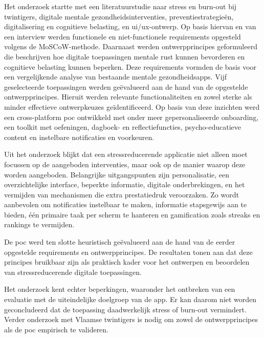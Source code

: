 \vspace{1em}

Het onderzoek startte met een literatuurstudie naar stress en burn-out bij twintigers, digitale mentale gezondheidsinterventies, preventiestrategieën, digitalisering en cognitieve belasting, en \acrshort{ui}/\acrshort{ux}-ontwerp. Op basis hiervan en van een interview werden functionele en niet-functionele requirements opgesteld volgens de MoSCoW-methode. Daarnaast werden ontwerpprincipes geformuleerd die beschrijven hoe digitale toepassingen mentale rust kunnen bevorderen en cognitieve belasting kunnen beperken. Deze requirements vormden de basis voor een vergelijkende analyse van bestaande mentale gezondheidsapps. Vijf geselecteerde toepassingen werden geëvalueerd aan de hand van de opgestelde ontwerpprincipes. Hieruit werden relevante functionaliteiten en zowel sterke als minder effectieve ontwerpkeuzes geïdentificeerd. Op basis van deze inzichten werd een cross-platform \acrshort{poc} ontwikkeld met onder meer gepersonaliseerde onboarding, een toolkit met oefeningen, dagboek- en reflectiefuncties, psycho-educatieve content en instelbare notificaties en voorkeuren.

\vspace{1em}

Uit het onderzoek blijkt dat een stressreducerende applicatie niet alleen moet focussen op de aangeboden interventies, maar ook op de manier waarop deze worden aangeboden. Belangrijke uitgangspunten zijn personalisatie, een overzichtelijke interface, beperkte informatie, digitale onderbrekingen, en het vermijden van mechanismen die extra prestatiedruk veroorzaken. Zo wordt aanbevolen om notificaties instelbaar te maken, informatie stapsgewijs aan te bieden, één primaire taak per scherm te hanteren en gamification zoals streaks en rankings te vermijden.

\vspace{1em}

De \acrshort{poc} werd ten slotte heuristisch geëvalueerd aan de hand van de eerder opgestelde requirements en ontwerpprincipes. De resultaten tonen aan dat deze principes bruikbaar zijn als praktisch kader voor het ontwerpen en beoordelen van stressreducerende digitale toepassingen. 

\vspace{1em}

Het onderzoek kent echter beperkingen, waaronder het ontbreken van een evaluatie met de uiteindelijke doelgroep van de app. Er kan daarom niet worden geconcludeerd dat de toepassing daadwerkelijk stress of burn-out vermindert. Verder onderzoek met Vlaamse twintigers is nodig om zowel de ontwerpprincipes als de \acrlong{poc} empirisch te valideren.
